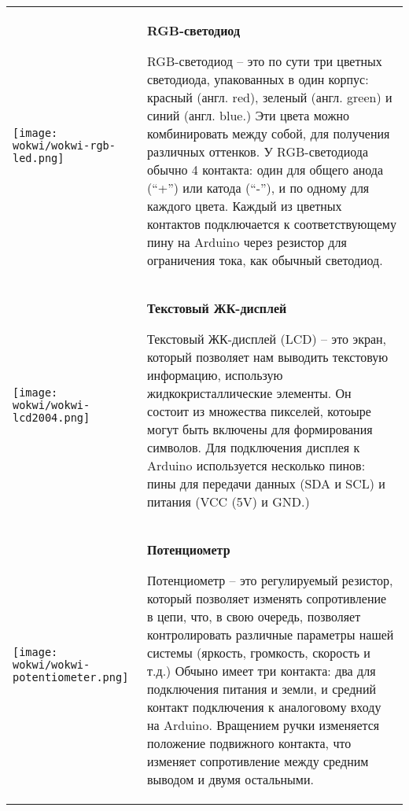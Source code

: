 \documentclass[../sparc.tex]{subfiles}
\begin{document}
\begin{longtable}{|>{
      \centering\arraybackslash
    }p{3cm}|>{
      \centering\arraybackslash}p{8cm}|
  }
{} \\  \hline

\parbox[t][3,6cm][c]{2cm}{\centering \vspace{1cm}
  \texttt{[image: wokwi/wokwi-rgb-led.png]}} &
\parbox[t][5.1cm][t]{8cm}{\centering \textbf{RGB-светодиод}\\ \raggedright

  RGB-светодиод -- это по сути три цветных светодиода, упакованных в один корпус:
  красный (англ. red), зеленый (англ. green) и синий (англ. blue.)  Эти цвета
  можно комбинировать между собой, для получения различных оттенков.  У
  RGB-светодиода обычно 4 контакта: один для общего анода (``+'') или катода
  (``-''), и по одному для каждого цвета.  Каждый из цветных контактов
  подключается к соответствующему пину на Arduino через резистор для ограничения
  тока, как обычный светодиод.

} \\  \hline

\parbox[t][2,8cm][c]{2cm}{\centering \vspace{1cm}
  \texttt{[image: wokwi/wokwi-lcd2004.png]}} &
\parbox[t][4.3cm][t]{8cm}{\centering \textbf{Текстовый ЖК-дисплей}\\ \raggedright

  Текстовый ЖК-дисплей (LCD) -- это экран, который позволяет нам выводить
  текстовую информацию, использую жидкокристаллические элементы.  Он состоит из
  множества пикселей, котоыре могут быть включены для формирования символов.
  Для подключения дисплея к Arduino используется несколько пинов: пины для
  передачи данных (SDA и SCL) и питания (VCC (5V) и GND.)

} \\  \hline

\parbox[t][2,5cm][c]{2cm}{\centering \vspace{1cm}
  \texttt{[image: wokwi/wokwi-potentiometer.png]}} &
\parbox[t][4.3cm][t]{8cm}{\centering \textbf{Потенциометр}\\ \raggedright

  Потенциометр -- это регулируемый резистор, который позволяет изменять
  сопротивление в цепи, что, в свою очередь, позволяет контролировать различные
  параметры нашей системы (яркость, громкость, скорость и т.д.)  Обчыно имеет
  три контакта: два для подключения питания и земли, и средний контакт
  подключения к аналоговому входу на Arduino.  Вращением ручки изменяется
  положение подвижного контакта, что изменяет сопротивление между средним
  выводом и двумя остальными.

}
\end{longtable}
\end{document}
